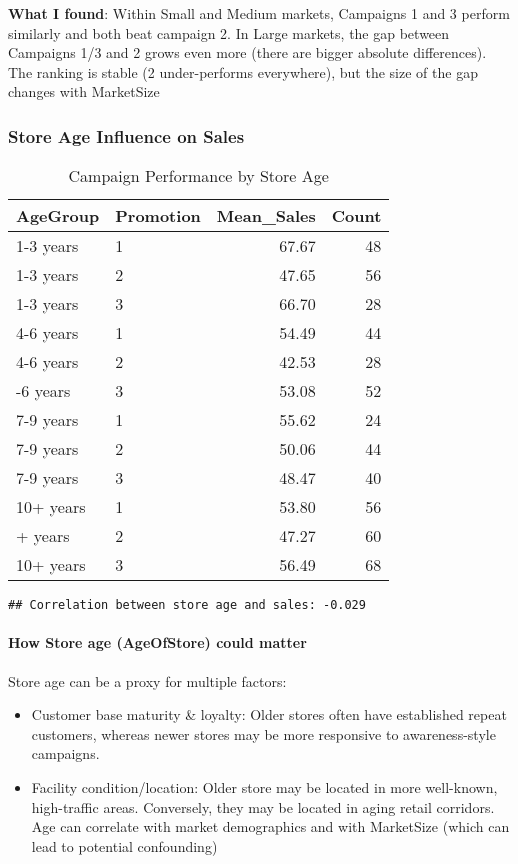 \documentclass[
]{article}
\providecommand{\tightlist}{%
  \setlength{\itemsep}{0pt}\setlength{\parskip}{0pt}}
\begin{document}
\textbf{What I found}: Within Small and Medium markets, Campaigns 1 and
3 perform similarly and both beat campaign 2. In Large markets, the gap
between Campaigns 1/3 and 2 grows even more (there are bigger absolute
differences). The ranking is stable (2 under-performs everywhere), but
the size of the gap changes with MarketSize

\subsubsection{Store Age Influence on
Sales}\label{store-age-influence-on-sales}

\begin{longtable}[t]{llrr}
\caption{\label{tab:store_age_detailed}Campaign Performance by Store Age}\\
\toprule
AgeGroup & Promotion & Mean\_Sales & Count\\
\midrule
1-3 years & 1 & 67.67 & 48\\
1-3 years & 2 & 47.65 & 56\\
1-3 years & 3 & 66.70 & 28\\
4-6 years & 1 & 54.49 & 44\\
4-6 years & 2 & 42.53 & 28\\
\addlinespace
4-6 years & 3 & 53.08 & 52\\
7-9 years & 1 & 55.62 & 24\\
7-9 years & 2 & 50.06 & 44\\
7-9 years & 3 & 48.47 & 40\\
10+ years & 1 & 53.80 & 56\\
\addlinespace
10+ years & 2 & 47.27 & 60\\
10+ years & 3 & 56.49 & 68\\
\bottomrule
\end{longtable}

\begin{verbatim}
## Correlation between store age and sales: -0.029
\end{verbatim}

\paragraph{How Store age (AgeOfStore) could
matter}\label{how-store-age-ageofstore-could-matter}

Store age can be a proxy for multiple factors:

\begin{itemize}
\tightlist
\item
  Customer base maturity \& loyalty: Older stores often have established
  repeat customers, whereas newer stores may be more responsive to
  awareness-style campaigns.
\item
  Facility condition/location: Older store may be located in more
  well-known, high-traffic areas. Conversely, they may be located in
  aging retail corridors. Age can correlate with market demographics and
  with MarketSize (which can lead to potential confounding)
\end{itemize}
\end{document}
